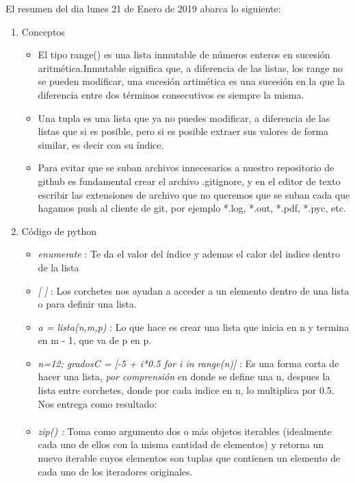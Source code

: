 \documentclass[letterpaper, 12pt,oneside]{article}
\begin{document}
	El resumen del dia lunes 21 de Enero de 2019 abarca lo siguiente:
	\begin{enumerate}
		\item Conceptos
			\begin{itemize}
				\item El tipo range() es una lista inmutable de números enteros en sucesión aritmética.Inmutable significa que, a diferencia de las listas, los range no se pueden modificar, una sucesión artimética es una sucesión en la que la diferencia entre dos términos consecutivos es siempre la misma.
				
				\item Una tupla es una lista que ya no puedes modificar, a diferencia de las listas que si es posible, pero si es posible extraer sus valores de forma similar, es decir con su índice.
				\item Para evitar que se suban archivos innecesarios a nuestro repositorio de github es fundamental crear el archivo .gitignore, y en el editor de texto escribir las extensiones de archivo que no queremos que se suban cada que hagamos push al cliente de git, por ejemplo *.log, *.out, *.pdf, *.pyc, etc.
			\end{itemize}
		
	
		
		\item Código de python
			\begin{itemize}
				\item {\textit{enumerate}} : Te da el valor del índice y ademas el calor del indice dentro de la lista
				\item {\textit{[ ]}} : Los corchetes nos ayudan a acceder a un elemento dentro de una lista o para definir una lista.
				\item {\textit{a = lista(n,m,p)}} : Lo que hace es crear una lista que inicia en n y termina en m - 1, que va de p en p.
				\item {\textit{n=12; gradosC = [-5 + i*0.5 for i in range(n)]}} :  Es una forma corta de hacer una lista, \textit{por comprensión} en donde se define una n, despues la lista entre corchetes, donde por cada indice en n, lo multiplica por 0.5. Nos entrega como resultado:
				\begin{align*}
				[-5.0, -4.5, -4.0, -3.5, -3.0, -2.5, -2.0, -1.5, -1.0, -0.5, 0.0, 0.5]
				\end{align*}
				\item {\textit{zip() :}} Toma como argumento dos o más objetos iterables (idealmente cada uno de ellos con la misma cantidad de elementos) y retorna un nuevo iterable cuyos elementos son tuplas que contienen un elemento de cada uno de los iteradores originales.
					

\end{itemize}
\end{enumerate}
\end{document}
